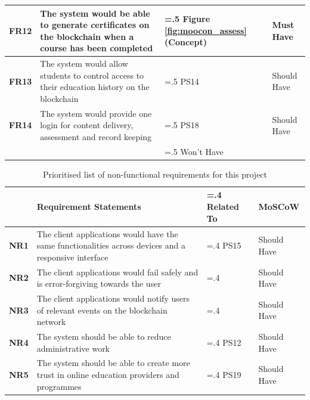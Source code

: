 \begin{table}[!h]
\begin{tabularx}{\textwidth}{>{\bfseries}l>{\hsize=1.5\hsize}X>{\hsize=.5\hsize}Xl}
        \\\midrule
        FR12 & The system would be able to generate certificates on the blockchain when a course 
        has been completed & Figure \ref{fig:moocon_assess} (Concept) & Must Have
        \\\midrule
        FR13 & The system would allow students to control access to their education history 
        on the blockchain & PS14 & Should Have
        \\\midrule
        FR14 & The system would provide one login for content delivery, assessment and 
        record keeping & PS18 & Should Have
        \\\midrule
         &  \multicolumn{2}{c}{Requirements targetting PS6, PS10, PS13, PS16} & Won't Have
        \\\bottomrule
    \end{tabularx}
\end{table}

\begin{table}[!h] 
    \caption{Prioritised list of non-functional requirements for this project}
    \centering
    \label{table:nonfx-reqs}
    \begin{tabularx}{\textwidth}{>{\bfseries}l>{\hsize=1.6\hsize}X>{\hsize=.4\hsize}Xl}
        & Requirement Statements & Related To & MoSCoW
        \\\toprule
        NR1 & The client applications would have the same functionalities across devices and 
        a responsive interface & PS15 & Should Have
        \\\midrule
        NR2 & The client applications would fail safely and is error-forgiving 
        towards the user &  & Should Have
        \\\midrule
        NR3 & The client applications would notify users of relevant events on the blockchain
        network &  & Should Have
        \\\midrule
        NR4 & The system should be able to reduce administrative work & PS12 & Should Have
        \\\midrule
        NR5 & The system should be able to create more trust in online education providers 
        and programmes & PS19 & Should Have
        \\\bottomrule
    \end{tabularx}
\end{table}